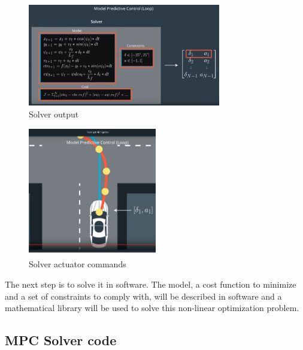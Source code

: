 \documentclass[11pt]{article}
\begin{document}
\begin{figure}[h]
    \centering
    \includegraphics[width=0.75\textwidth]{solver_out}
    \caption{Solver output}
    \label{fig:solver_out}
\end{figure}

\begin{figure}[h]
    \centering
    \includegraphics[width=0.5\textwidth]{solver_actuate}
    \caption{Solver actuator commands}
    \label{fig:solver_actuate}
\end{figure}

\FloatBarrier

The next step is to solve it in software. The model, a cost function to minimize and a set of constraints to comply with, will be described in software and a mathematical library will be used to solve this non-linear optimization problem.

\subsection{MPC Solver code}
\end{document}
